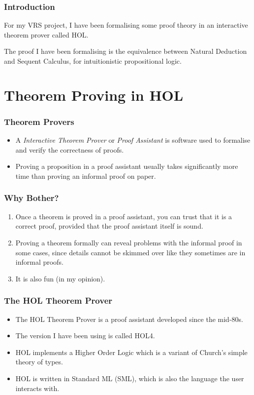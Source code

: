 \documentclass[english,svgnames,hide notes,12pt]{beamer}
\title{\large\presentationtitle}
\author{Alexander Cox\\
		\small Supervised by Michael Norrish\\
		\small The Australian National University
	}
\date{\today}
\theoremstyle{definition}
\theoremstyle{remark}
\begin{document}
\thispagestyle{empty}
\begin{frame}
    \titlepage{}
\end{frame}

\begin{frame}
    \frametitle{Introduction}
    For my VRS project, I have been formalising some proof theory in an interactive theorem prover called HOL. 

    The proof I have been formalising is the equivalence between Natural Deduction and Sequent Calculus, for intuitionistic propositional logic.
\end{frame}

\section{Theorem Proving in HOL}

\begin{frame}
    \frametitle{Theorem Provers}
    \begin{itemize}
        \item A \emph{Interactive Theorem Prover} or \emph{Proof Assistant} is software used to formalise and verify the correctness of proofs.
        \item Proving a proposition in a proof assistant usually takes significantly more time than proving an informal proof on paper.
    \end{itemize}
\end{frame}

\begin{frame}
    \frametitle{Why Bother?}
    \begin{enumerate}
        \item Once a theorem is proved in a proof assistant, you can trust that it is a correct proof, provided that the proof assistant itself is sound.
        \item Proving a theorem formally can reveal problems with the informal proof in some cases, since details cannot be skimmed over like they sometimes are in informal proofs.
        \item It is also fun (in my opinion).
    \end{enumerate}
\end{frame}

\begin{frame}
	\frametitle{The HOL Theorem Prover}
    \begin{itemize}
        \item The HOL Theorem Prover is a proof assistant developed since the mid-80s. 
        \item The version I have been using is called HOL4. 
        \item HOL implements a Higher Order Logic which is a variant of Church's simple theory of types.
        \item HOL is written in Standard ML (SML), which is also the language the user interacts with.
    \end{itemize}
\end{frame}
\end{document}
